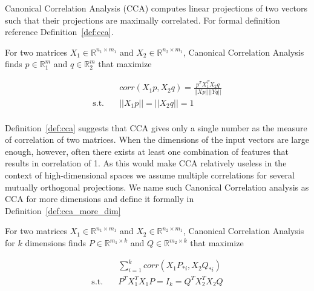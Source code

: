 Canonical Correlation Analysis (CCA) computes linear projections of two vectors
such that their projections are maximally correlated. For formal definition
reference Definition~\ref{def:cca}.

\begin{defn}\label{def:cca}

  For two matrices $X_1 \in \mathbb{R}^{n_1 \times m_1}$ and $X_2 \in
  \mathbb{R}^{n_2 \times m_1}$, Canonical Correlation Analysis finds $p \in
  \mathbb{R}^m_1$ and $q \in \mathbb{R}^m_2$ that maximize

  \begin{equation}
    \begin{split}
      & corr(X_1p, X_2q) = \frac{p^TX_1^TX_2q}{||Xp|| ||Yq||} \\
      \text{s.t.}\quad &||X_1p|| = ||X_2q|| = 1 \\
    \end{split}
  \end{equation}


\end{defn}

Definition~\ref{def:cca} suggests that CCA gives only a single number as the
measure of correlation of two matrices. When the dimensions of the input vectors
are large enough, however, often there exists at least one combination of
features that results in correlation of 1. As this would make CCA relatively
useless in the context of high-dimensional spaces we assume multiple
correlations for several mutually orthogonal projections. We name such Canonical
Correlation analysis as CCA for more dimensions and define it formally in
Definition~\ref{def:cca_more_dim}

\begin{defn}\label{def:cca_more_dim}

  For two matrices $X_1 \in \mathbb{R}^{n_1 \times m_1}$ and $X_2 \in
  \mathbb{R}^{n_2 \times m_1}$, Canonical Correlation Analysis for $k$
  dimensions finds $P \in \mathbb{R}^{m_1 \times k}$ and $Q \in \mathbb{R}^{m_2
  \times k}$ that maximize

  \begin{equation}
    \begin{split}
      &\sum_{i = 1}^k corr(X_1P_{*i}, X_2Q_{*i}) \\
      \text{s.t.}\quad &P^TX_1^TX_1P = I_k = Q^TX_2^TX_2Q \\
    \end{split}
  \end{equation}


\end{defn}

